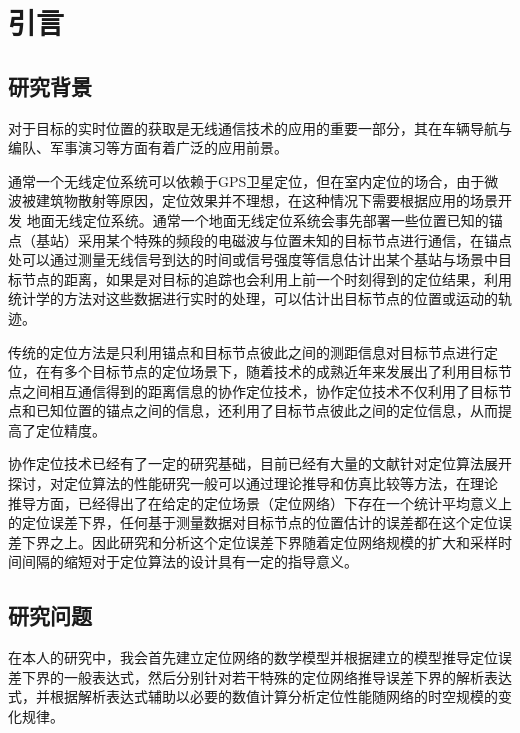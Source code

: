 \chapter{引言}
\label{cha:intro}

\section{研究背景}
对于目标的实时位置的获取是无线通信技术的应用的重要一部分\cite{indoorPos}，其在车辆导航与编队、军事演习等方面有着广泛的应用前景。


通常一个无线定位系统可以依赖于GPS卫星定位，但在室内定位的场合，由于微波被建筑物散射等原因，定位效果并不理想，在这种情况下需要根据应用的场景开发
地面无线定位系统。通常一个地面无线定位系统会事先部署一些位置已知的锚点（基站）采用某个特殊的频段的电磁波与位置未知的目标节点进行通信，在锚点处可以通过测量无线信号到达的时间或信号强度等信息估计出某个基站与场景中目标节点的距离，如果是对目标的追踪也会利用上前一个时刻得到的定位结果，利用统计学的方法对这些数据进行实时的处理，可以估计出目标节点的位置或运动的轨迹。


传统的定位方法是只利用锚点和目标节点彼此之间的测距信息对目标节点进行定位，在有多个目标节点的定位场景下，随着技术的成熟近年来发展出了利用目标节点之间相互通信得到的距离信息的协作定位技术，协作定位技术不仅利用了目标节点和已知位置的锚点之间的信息，还利用了目标节点彼此之间的定位信息，从而提高了定位精度。


协作定位技术已经有了一定的研究基础，目前已经有大量的文献针对定位算法展开探讨，对定位算法的性能研究一般可以通过理论推导和仿真比较等方法，在理论
推导方面，已经得出了在给定的定位场景（定位网络）下存在一个统计平均意义上的定位误差下界\cite{LimitBound}，任何基于测量数据对目标节点的位置估计的误差都在这个定位误差下界之上。因此研究和分析这个定位误差下界随着定位网络规模的扩大和采样时间间隔的缩短对于定位算法的设计具有一定的指导意义。

\section{研究问题}
在本人的研究中，我会首先建立定位网络的数学模型并根据建立的模型推导定位误差下界的一般表达式，然后分别针对若干特殊的定位网络推导误差下界的解析表达式，并根据解析表达式辅助以必要的数值计算分析定位性能随网络的时空规模的变化规律。

